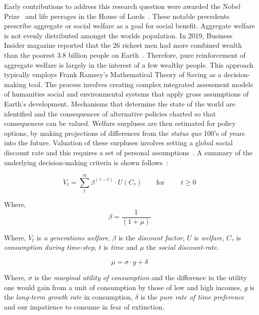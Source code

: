 \documentclass[11pt, oneside]{book}   	%
\begin{document}
Early contributions to address this research question were awarded the Nobel Prize~\cite{np1} and life peerages in the House of Lords~\cite{g1}. These notable precedents prescribe aggregate or social welfare as a goal for social benefit. Aggregate welfare is not evenly distributed amongst the worlds population. In 2019, Business Insider magazine reported that the 26 richest men had more combined wealth than the poorest 3.8 billion people on Earth~\cite{bi1}. Therefore, pure reinforcement of aggregate welfare is largely in the interest of a few wealthy people. This approach typically employs Frank Ramsey's Mathematical Theory of Saving as a decision-making tool. The process involves creating complex integrated assessment models of humanities social and environmental systems that apply gross assumptions of Earth's development. Mechanisms that determine the state of the world are identified and the consequences of alternative policies charted so that consequences can be valued. Welfare surpluses are then estimated for policy options, by making projections of differences from the \emph{status quo} 100's of years into the future. Valuation of these surpluses involves setting a global social discount rate and this requires a set of personal assumptions~\cite{pd2}. A summary of the underlying decision-making criteria is shown follows~\cite{fr1}:

\begin{equation}
V_t = \sum_t^\infty \beta^{(\tau - t)} \cdot U (C_\tau)
\qquad \text{for }
\qquad t \geq 0
\end{equation}

Where,
\begin{equation}
\beta = \frac{1}{(1+\mu)}
\end{equation}

Where, $V_t$ is \emph{a generations welfare}, $\beta$ is the \emph{discount factor}, $U$ is \emph{welfare}, $C_\tau$ is \emph{consumption during time-step}, $t$ is \emph{time} and $\mu$ the \emph{social discount-rate}.

\begin{equation}
\mu = \sigma \cdot g + \delta
\end{equation}

Where, $\sigma$ is the \emph{marginal utility of consumption} and the difference in the utility one would gain from a unit of consumption by those of low and high incomes, $g$ is the \emph{long-term growth rate} in consumption, $\delta$ is the \emph{pure rate of time preference} and our impatience to consume in fear of extinction.
\end{document}
